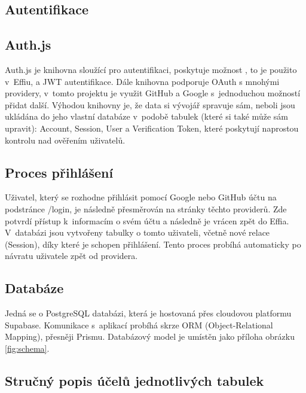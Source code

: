 \documentclass[12pt, a4paper,
openright
]{report}
\begin{document}
\clearpage
\subsection{Autentifikace}
\subsection{Auth.js}

Auth.js je knihovna sloužící pro autentifikaci, poskytuje možnost , to je použito v~Effiu, a JWT autentifikace. Dále knihovna podporuje OAuth s mnohými providery, v~tomto projektu je využit GitHub a Google s~jednoduchou možností přidat další. Výhodou knihovny je, že data si vývojář spravuje sám, neboli jsou ukládána do jeho vlastní databáze v~podobě tabulek (které si také může sám upravit): Account, Session, User a Verification Token, které poskytují naprostou kontrolu nad ověřením uživatelů.

\subsection{Proces přihlášení}
Uživatel, který se rozhodne přihlásit pomocí Google nebo GitHub účtu na podstránce /login, je následně přesměrován na stránky těchto providerů. Zde potvrdí přístup k~informacím o svém účtu a následně je vrácen zpět do Effia. V~databázi jsou vytvořeny tabulky o tomto uživateli, včetně nové relace (Session), díky které je schopen přihlášení. Tento proces probíhá automaticky po návratu uživatele zpět od providera.

\subsection{Databáze}

Jedná se o PostgreSQL databázi, která je hostovaná přes cloudovou platformu Supabase. Komunikace s~aplikací probíhá skrze ORM (Object-Relational Mapping), přesněji Prismu. Databázový model je umístěn jako příloha obrázku \ref{fig:schema}.

\subsection{Stručný popis účelů jednotlivých tabulek}
\end{document}
